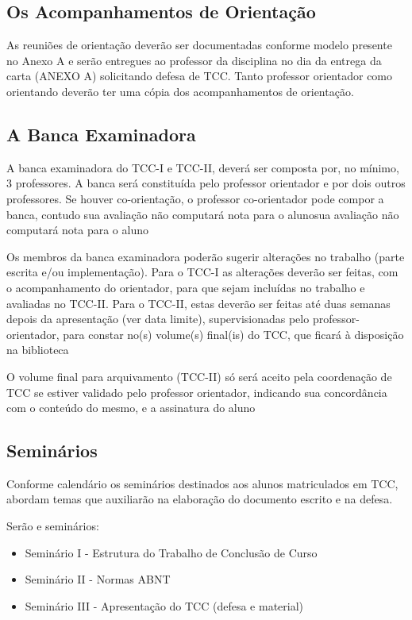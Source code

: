 \subsection{Os Acompanhamentos de Orienta\c{c}\~{a}o}

As reuni\~{o}es de orienta\c{c}\~{a}o dever\~{a}o ser documentadas conforme modelo presente no Anexo A e ser\~{a}o entregues ao professor da disciplina no dia da entrega da carta (ANEXO A) solicitando defesa de TCC.
Tanto professor orientador como orientando dever\~{a}o ter uma c\'{o}pia dos acompanhamentos de orienta\c{c}\~{a}o.
	

\subsection{A Banca Examinadora}

A banca examinadora do TCC-I e TCC-II, dever\'{a} ser composta por, no m\'{i}nimo, 3 professores. A banca ser\'{a} constitu\'{i}da pelo 
professor orientador e por dois outros professores. Se houver co-orienta\c{c}\~{a}o, o professor co-orientador pode compor a banca, contudo sua avalia\c{c}\~{a}o n\~{a}o computar\'{a} nota para o alunosua avalia\c{c}\~{a}o n\~{a}o computar\'{a} nota para o aluno 

Os membros da banca examinadora poder\~{a}o sugerir altera\c{c}\~{o}es no trabalho (parte escrita e/ou implementa\c{c}\~{a}o). Para o TCC-I as altera\c{c}\~{o}es dever\~{a}o ser feitas, com o acompanhamento do orientador, para que sejam inclu\'{i}das no trabalho e avaliadas no TCC-II. Para o TCC-II, estas dever\~{a}o ser feitas at\'{e} duas semanas depois da apresenta\c{c}\~{a}o (ver data limite), supervisionadas pelo professor-orientador, para constar no(s) volume(s) final(is) do TCC, que ficar\'{a} \`{a} disposi\c{c}\~{a}o na biblioteca

O volume final para arquivamento (TCC-II) s\'{o} ser\'{a} aceito pela coordena\c{c}\~{a}o de TCC se estiver validado pelo professor orientador, indicando sua concord\^{a}ncia com o conte\'{u}do do mesmo, e a assinatura do aluno


\subsection{Semin\'{a}rios}
Conforme calend\'{a}rio os semin\'{a}rios destinados aos alunos matriculados em TCC, abordam temas que auxiliar\~{a}o na elabora\c{c}\~{a}o do documento escrito e na defesa.

Ser\~{a}o e semin\'{a}rios:
	\begin{itemize}
		\item Semin\'{a}rio I - Estrutura do Trabalho de Conclus\~{a}o de Curso

		\item Semin\'{a}rio II - Normas ABNT

		\item Semin\'{a}rio III - Apresenta\c{c}\~{a}o do TCC (defesa e material)
	\end{itemize}

